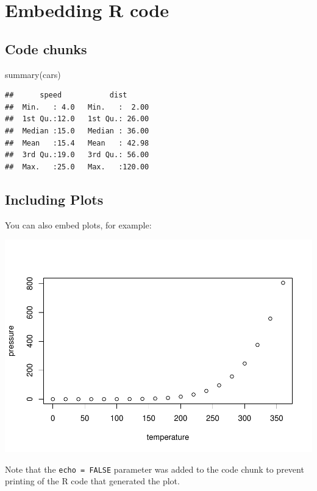 \documentclass[]{interact}
\theoremstyle{plain}%
\theoremstyle{definition}
\theoremstyle{remark}
\newenvironment{Shaded}{\begin{snugshade}}{\end{snugshade}}
\newcommand{\FunctionTok}[1]{\textcolor[rgb]{0.00,0.00,0.00}{#1}}
\newcommand{\NormalTok}[1]{#1}
\begin{document}
\hypertarget{embedding-r-code}{%
\section{Embedding R code}\label{embedding-r-code}}

\hypertarget{code-chunks}{%
\subsection{Code chunks}\label{code-chunks}}

\begin{Shaded}
\begin{Highlighting}[]
\FunctionTok{summary}\NormalTok{(cars)}
\end{Highlighting}
\end{Shaded}

\begin{verbatim}
##      speed           dist       
##  Min.   : 4.0   Min.   :  2.00  
##  1st Qu.:12.0   1st Qu.: 26.00  
##  Median :15.0   Median : 36.00  
##  Mean   :15.4   Mean   : 42.98  
##  3rd Qu.:19.0   3rd Qu.: 56.00  
##  Max.   :25.0   Max.   :120.00
\end{verbatim}

\hypertarget{including-plots}{%
\subsection{Including Plots}\label{including-plots}}

You can also embed plots, for example:

\includegraphics[width=0.8\linewidth]{Untitled_files/figure-latex/pressure-1}

Note that the \texttt{echo\ =\ FALSE} parameter was added to the code
chunk to prevent printing of the R code that generated the plot.
\end{document}
